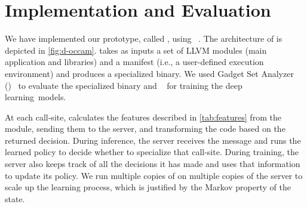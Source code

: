 \section{Implementation and Evaluation}

We have implemented our prototype, called \doccam,
using \occam~\cite{occam}. The architecture of \doccam is depicted in
\cref{fig:d-occam}.
%
\doccam takes as inputs a set of LLVM modules (main application and
libraries) and a manifest (i.e., a user-defined execution environment)
and produces a specialized binary.
%
We used Gadget Set Analyzer (\gsa)~\cite{gsa} to evaluate 
 the specialized binary and
\pytorch~\cite{pytorch} for training the deep learning~models. %
 
At each call-site, \occam calculates the features
described in \cref{tab:features} from the \llvm module, sending them to the \pytorch server, and
transforming the code based on the returned decision.
%
During inference, the \pytorch server receives the message and runs the learned
policy to decide whether to specialize that
call-site. During training, the \pytorch server also keeps track of all the
decisions it has made and uses that information to update its
policy. We run multiple copies of \occam on multiple copies of the \pytorch
server to scale up the learning process, which is justified by the Markov property of the state.%





